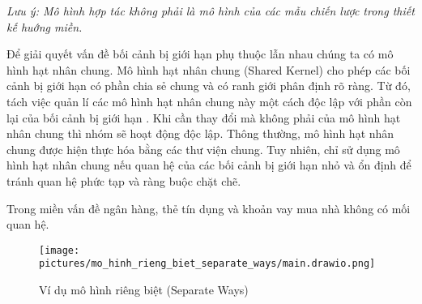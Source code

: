 \textit{Lưu ý: Mô hình hợp tác không phải là mô hình của các mẫu chiến lược trong thiết kế huớng miền.}

Để giải quyết vấn đề bối cảnh bị giới hạn phụ thuộc lẫn nhau chúng ta có mô hình hạt nhân chung. Mô hình hạt nhân chung (Shared Kernel) cho phép các bối cảnh bị giới hạn có phần chia sẻ chung và có ranh giới phân định rõ ràng. Từ đó, tách việc quản lí các mô hình hạt nhân chung này một cách độc lập với phần còn lại của bối cảnh bị giới hạn . Khi cần thay đổi mà không phải của mô hình hạt nhân chung thì nhóm sẽ hoạt động độc lập. Thông thường, mô hình hạt nhân chung được hiện thực hóa bằng các thư viện chung. Tuy nhiên, chỉ sử dụng mô hình hạt nhân chung nếu quan hệ của các bối cảnh bị giới hạn nhỏ và ổn định để tránh quan hệ phức tạp và ràng buộc chặt chẽ.



















\begin{example} Trong miền vấn đề ngân hàng, thẻ tín dụng và khoản vay mua nhà không có mối quan hệ.

    \begin{figure}[H]

        \centering

        \texttt{[image: pictures/mo\_hinh\_rieng\_biet\_separate\_ways/main.drawio.png]}

        \caption{Ví dụ mô hình riêng biệt (Separate Ways)}

    \end{figure}

\end{example}

